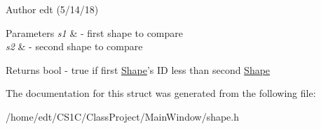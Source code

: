 \begin{DoxyAuthor}{Author}
edt (5/14/18)
\end{DoxyAuthor}

\begin{DoxyParams}{Parameters}
{\em s1} & -\/ first shape to compare \\
\hline
{\em s2} & -\/ second shape to compare\\
\hline
\end{DoxyParams}
\begin{DoxyReturn}{Returns}
bool -\/ true if first \hyperlink{classShape}{Shape}'s I\-D less than second \hyperlink{classShape}{Shape} 
\end{DoxyReturn}


The documentation for this struct was generated from the following file\-:\begin{DoxyCompactItemize}
\item 
/home/edt/\-C\-S1\-C/\-Class\-Project/\-Main\-Window/shape.\-h\end{DoxyCompactItemize}
